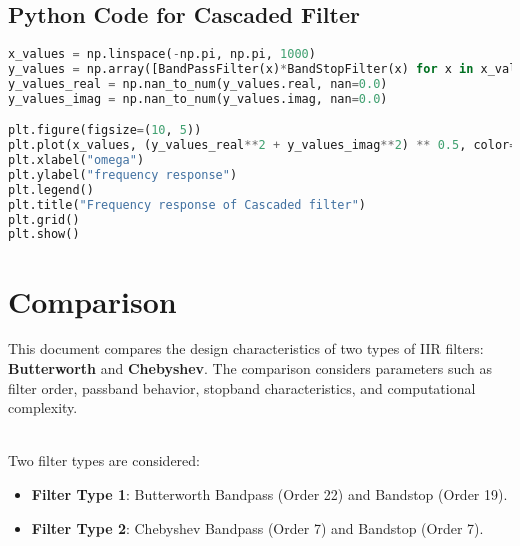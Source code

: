 \documentclass{article}
\begin{document}
\subsection{Python Code for Cascaded Filter}
\begin{lstlisting}[language=Python, caption=Filter Type Definition]
x_values = np.linspace(-np.pi, np.pi, 1000)
y_values = np.array([BandPassFilter(x)*BandStopFilter(x) for x in x_values])
y_values_real = np.nan_to_num(y_values.real, nan=0.0)
y_values_imag = np.nan_to_num(y_values.imag, nan=0.0)

plt.figure(figsize=(10, 5))
plt.plot(x_values, (y_values_real**2 + y_values_imag**2) ** 0.5, color="r")
plt.xlabel("omega")
plt.ylabel("frequency response")
plt.legend()
plt.title("Frequency response of Cascaded filter")
plt.grid()
plt.show()
\end{lstlisting}




\section{Comparison}
This document compares the design characteristics of two types of IIR filters: \textbf{Butterworth} and \textbf{Chebyshev}. The comparison considers parameters such as filter order, passband behavior, stopband characteristics, and computational complexity.

\\
Two filter types are considered:
\begin{itemize}
    \item \textbf{Filter Type 1}: Butterworth Bandpass (Order 22) and Bandstop (Order 19).
    \item \textbf{Filter Type 2}: Chebyshev Bandpass (Order 7) and Bandstop (Order 7).
\end{itemize}
\end{document}
